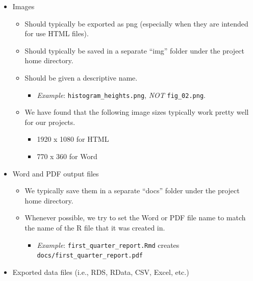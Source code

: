 \documentclass[
  letterpaper,
  DIV=11,
  numbers=noendperiod]{scrreprt}
\providecommand{\tightlist}{%
  \setlength{\itemsep}{0pt}\setlength{\parskip}{0pt}}\usepackage{longtable,booktabs,array}
\begin{document}
\begin{itemize}
\tightlist
\item
  Images

  \begin{itemize}
  \tightlist
  \item
    Should typically be exported as png (especially when they are
    intended for use HTML files).\\
  \item
    Should typically be saved in a separate ``img'' folder under the
    project home directory.\\
  \item
    Should be given a descriptive name.

    \begin{itemize}
    \tightlist
    \item
      \emph{Example}: \texttt{histogram\_heights.png}, \emph{NOT}
      \texttt{fig\_02.png}.
    \end{itemize}
  \item
    We have found that the following image sizes typically work pretty
    well for our projects.

    \begin{itemize}
    \tightlist
    \item
      1920 x 1080 for HTML\\
    \item
      770 x 360 for Word
    \end{itemize}
  \end{itemize}
\item
  Word and PDF output files

  \begin{itemize}
  \tightlist
  \item
    We typically save them in a separate ``docs'' folder under the
    project home directory.
  \item
    Whenever possible, we try to set the Word or PDF file name to match
    the name of the R file that it was created in.

    \begin{itemize}
    \tightlist
    \item
      \emph{Example}: \texttt{first\_quarter\_report.Rmd} creates
      \texttt{docs/first\_quarter\_report.pdf}
    \end{itemize}
  \end{itemize}
\item
  Exported data files (i.e., RDS, RData, CSV, Excel, etc.)


\end{itemize}
\end{document}
